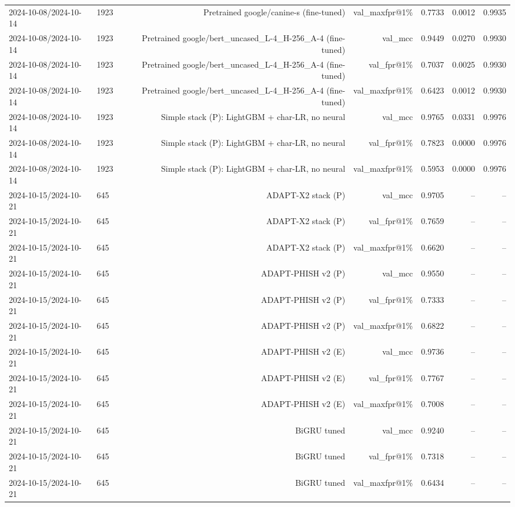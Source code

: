 \begin{table}[t]
\begin{tabular}{llrrrrr}
2024-10-08/2024-10-14 & 1923 & Pretrained google/canine-s (fine-tuned) & val\_maxfpr@1\% & 0.7733 & 0.0012 & 0.9935 \\
2024-10-08/2024-10-14 & 1923 & Pretrained google/bert\_uncased\_L-4\_H-256\_A-4 (fine-tuned) & val\_mcc & 0.9449 & 0.0270 & 0.9930 \\
2024-10-08/2024-10-14 & 1923 & Pretrained google/bert\_uncased\_L-4\_H-256\_A-4 (fine-tuned) & val\_fpr@1\% & 0.7037 & 0.0025 & 0.9930 \\
2024-10-08/2024-10-14 & 1923 & Pretrained google/bert\_uncased\_L-4\_H-256\_A-4 (fine-tuned) & val\_maxfpr@1\% & 0.6423 & 0.0012 & 0.9930 \\
2024-10-08/2024-10-14 & 1923 & Simple stack (P): LightGBM + char-LR, no neural & val\_mcc & 0.9765 & 0.0331 & 0.9976 \\
2024-10-08/2024-10-14 & 1923 & Simple stack (P): LightGBM + char-LR, no neural & val\_fpr@1\% & 0.7823 & 0.0000 & 0.9976 \\
2024-10-08/2024-10-14 & 1923 & Simple stack (P): LightGBM + char-LR, no neural & val\_maxfpr@1\% & 0.5953 & 0.0000 & 0.9976 \\
2024-10-15/2024-10-21 & 645 & ADAPT-X2 stack (P) & val\_mcc & 0.9705 & -- & -- \\
2024-10-15/2024-10-21 & 645 & ADAPT-X2 stack (P) & val\_fpr@1\% & 0.7659 & -- & -- \\
2024-10-15/2024-10-21 & 645 & ADAPT-X2 stack (P) & val\_maxfpr@1\% & 0.6620 & -- & -- \\
2024-10-15/2024-10-21 & 645 & ADAPT-PHISH v2 (P) & val\_mcc & 0.9550 & -- & -- \\
2024-10-15/2024-10-21 & 645 & ADAPT-PHISH v2 (P) & val\_fpr@1\% & 0.7333 & -- & -- \\
2024-10-15/2024-10-21 & 645 & ADAPT-PHISH v2 (P) & val\_maxfpr@1\% & 0.6822 & -- & -- \\
2024-10-15/2024-10-21 & 645 & ADAPT-PHISH v2 (E) & val\_mcc & 0.9736 & -- & -- \\
2024-10-15/2024-10-21 & 645 & ADAPT-PHISH v2 (E) & val\_fpr@1\% & 0.7767 & -- & -- \\
2024-10-15/2024-10-21 & 645 & ADAPT-PHISH v2 (E) & val\_maxfpr@1\% & 0.7008 & -- & -- \\
2024-10-15/2024-10-21 & 645 & BiGRU tuned & val\_mcc & 0.9240 & -- & -- \\
2024-10-15/2024-10-21 & 645 & BiGRU tuned & val\_fpr@1\% & 0.7318 & -- & -- \\
2024-10-15/2024-10-21 & 645 & BiGRU tuned & val\_maxfpr@1\% & 0.6434 & -- & -- \\

\end{tabular}
\end{table}
